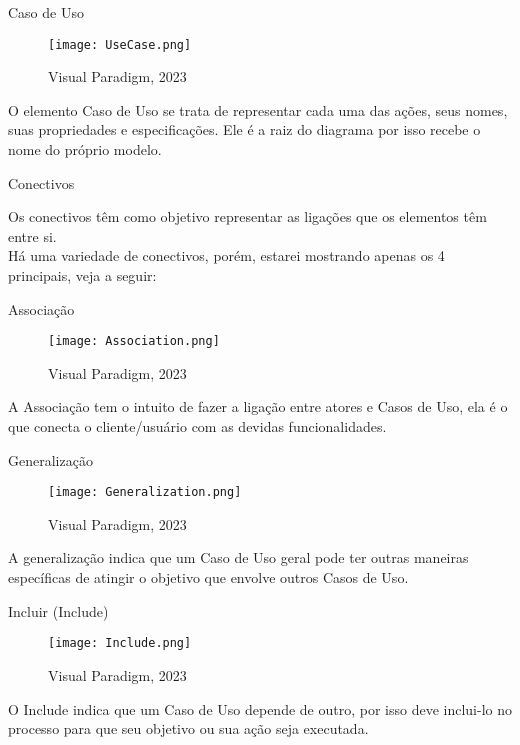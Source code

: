 \documentclass[12pt, a4paper]{article}
\begin{document}
{\Large Caso de Uso}
\begin{figure}[h]
   \centering
   \texttt{[image: UseCase.png]}
   \caption{Visual Paradigm, 2023}
\end{figure}

   O elemento Caso de Uso se trata de representar cada uma das ações,
seus nomes, suas propriedades e especificações. Ele é a raiz do diagrama por
isso recebe o nome do próprio modelo.

\vspace{0.75cm}

{\Large Conectivos}

\vspace{0.75cm}

   Os conectivos têm como objetivo representar as ligações que os elementos têm entre si.\\ 
Há uma variedade de conectivos, porém, estarei mostrando apenas os 4 principais, veja a seguir:

\vspace{0.75cm}

{\Large Associação}
\begin{figure}[h]
   \centering
   \texttt{[image: Association.png]}
   \caption{Visual Paradigm, 2023}
\end{figure}

   A Associação tem o intuito de fazer a ligação entre atores e Casos de
Uso, ela é o que conecta o cliente/usuário com as devidas funcionalidades.

\newpage

\vspace{0.75cm}

{\Large Generalização}
\begin{figure}[h]
   \centering
   \texttt{[image: Generalization.png]}
   \caption{Visual Paradigm, 2023}
\end{figure}

   A generalização indica que um Caso de Uso geral pode ter outras
maneiras específicas de atingir o objetivo que envolve outros Casos de
Uso.

\vspace{0.75cm}

{\Large Incluir (Include)}
\begin{figure}[h]
   \centering
   \texttt{[image: Include.png]}
   \caption{Visual Paradigm, 2023}
\end{figure}

   O Include indica que um Caso de Uso depende de outro, por isso
deve inclui-lo no processo para que seu objetivo ou sua ação seja
executada.
\end{document}
